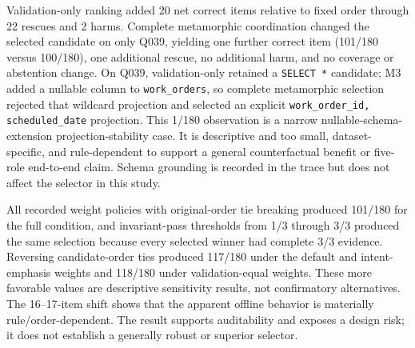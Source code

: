 \documentclass[applsci,article,submit,moreauthors]{Definitions/mdpi}
\begin{document}
\begin{table}[htbp]
\caption{New v3 offline selection over one historical eight-slot pool per question. All methods choose after the same shared precomputed 32-attempt evidence collection. Accuracy is finite-corpus strict execution equality after all blackboards were sealed; this is not a new-generation or five-role end-to-end experiment.}
\label{tab:offline}
\centering
\small
{}
\end{table}

Validation-only ranking added 20 net correct items relative to fixed order through 22 rescues and 2 harms. Complete metamorphic coordination changed the selected candidate on only Q039, yielding one further correct item (101/180 versus 100/180), one additional rescue, no additional harm, and no coverage or abstention change. On Q039, validation-only retained a \texttt{SELECT *} candidate; M3 added a nullable column to \texttt{work\_orders}, so complete metamorphic selection rejected that wildcard projection and selected an explicit \texttt{work\_order\_id, scheduled\_date} projection. This 1/180 observation is a narrow nullable-schema-extension projection-stability case. It is descriptive and too small, dataset-specific, and rule-dependent to support a general counterfactual benefit or five-role end-to-end claim. Schema grounding is recorded in the trace but does not affect the selector in this study.

All recorded weight policies with original-order tie breaking produced 101/180 for the full condition, and invariant-pass thresholds from 1/3 through 3/3 produced the same selection because every selected winner had complete 3/3 evidence. Reversing candidate-order ties produced 117/180 under the default and intent-emphasis weights and 118/180 under validation-equal weights. These more favorable values are descriptive sensitivity results, not confirmatory alternatives. The 16--17-item shift shows that the apparent offline behavior is materially rule/order-dependent. The result supports auditability and exposes a design risk; it does not establish a generally robust or superior selector.
\end{document}

